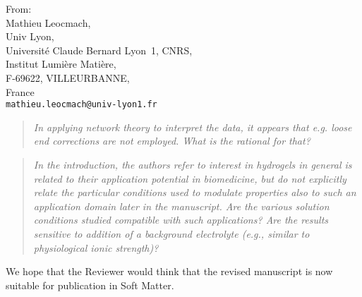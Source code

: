 \documentclass[a4paper, parskip=true, firsthead=false, fromemail=true, foldmarks=false]{scrlttr2}
\newenvironment{quotationi}
{\begin{quotation}\itshape}
{\end{quotation}}
\newcommand{\journal}{Soft Matter}
\begin{document}
\begin{letter}{From:\\
Mathieu Leocmach,\\
Univ Lyon,\\ 
Universit\'e Claude Bernard Lyon~1, CNRS,\\
Institut Lumi\`ere Mati\`ere,\\
F-69622, VILLEURBANNE,\\
France\\
\texttt{mathieu.leocmach@univ-lyon1.fr}
}
\begin{quotationi}
In applying network theory to interpret the data, it appears that e.g. loose end corrections are not employed. What is the rational for that?
\end{quotationi}

\begin{quotationi}
In the introduction, the authors refer to interest in hydrogels in general is related to their application potential in biomedicine, but do not explicitly relate the particular conditions used to modulate properties also to such an application domain later in the manuscript. Are the various solution conditions studied compatible with such applications? Are the results sensitive to addition of a background electrolyte (e.g., similar to physiological ionic strength)?

\end{quotationi}



We hope that the Reviewer would think that the revised manuscript is now suitable for publication in \journal. 


\end{letter} 
\end{document}
